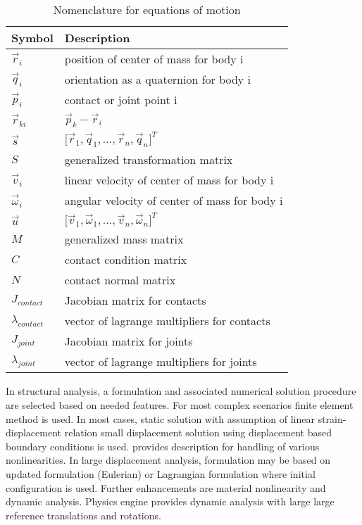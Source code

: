 \begin {table}[htb!]
\begin{center}
\begin{tabular}{|l| l|}
\hline
{\bf Symbol} & {\bf Description} \\  \hline
$\vec{r}_i$ & position of center of mass for body i  \\ \hline
$\vec{q}_i$ & orientation as a quaternion for body i  \\ \hline
$\vec{p}_i$ & contact or joint point i  \\ \hline
$\vec{r}_{ki}$ & $\vec{p}_k - \vec{r}_i$  \\ \hline
$\vec{s}$ & $\lbrack \vec{r}_1, \vec{q}_1,...,\vec{r}_n, \vec{q}_n \rbrack ^T $\\ \hline
$S$ & generalized transformation matrix  \\ \hline
$\vec{v}_i$ & linear velocity of  center of mass for body i  \\ \hline
$\vec{\omega}_i$ & angular velocity of center of mass for body i  \\ \hline
$\vec{u}$ & $\lbrack \vec{v}_1, \vec{\omega}_1,...,\vec{v}_n, \vec{\omega}_n \rbrack ^T $\\ \hline
$M$ & generalized mass matrix  \\ \hline
$C$ & contact condition matrix  \\ \hline
$N$ & contact normal matrix  \\ \hline
$J_{contact}$ & Jacobian matrix for contacts  \\ \hline
$\lambda_{contact}$ & vector of lagrange multipliers for contacts  \\ \hline
$J_{joint}$ & Jacobian matrix for joints  \\ \hline
$\lambda_{joint}$ & vector of lagrange multipliers for joints  \\ \hline
\end {tabular}
\end{center}
\caption {Nomenclature for equations of motion} \label{tab:eom}
\end {table}


In structural analysis, a formulation and associated numerical solution procedure are selected 
based on needed features.
For most complex scenarios finite element method is used.
In most cases, static solution with assumption of linear strain-displacement relation small 
displacement solution using displacement based boundary conditions is used.
\citet{bathe-1975} provides description for handling of various nonlinearities.
In large displacement analysis, formulation may be based on updated formulation (Eulerian) or
Lagrangian formulation where initial configuration is used.
Further enhancements are material nonlinearity and dynamic analysis.
Physics engine provides dynamic analysis with large large reference translations and rotations.

